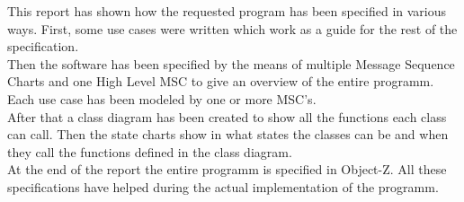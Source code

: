 This report has shown how the requested program has been specified in various ways. First, some use cases were written which work as a guide for the rest of the specification.\\
Then the software has been specified by the means of multiple Message Sequence Charts and one High Level MSC to give an overview of the entire programm. Each use case has been modeled by one or more MSC's. \\
After that a class diagram has been created to show all the functions each class can call. Then the state charts show in what states the classes can be and when they call the functions defined in the class diagram. \\
At the end of the report the entire programm is specified in Object-Z. All these specifications have helped during the actual implementation of the programm. 